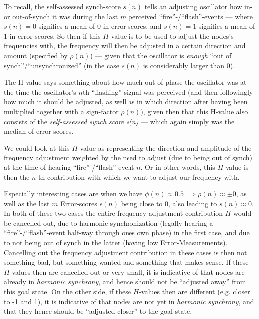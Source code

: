 		To recall, the self-assessed synch-score $s(n)$ tells an adjusting oscillator how in- or out-of-synch it was during the last $m$ perceived ``fire''-/``flash''-events — where $s(n)=0$ signifies a mean of 0 in error-scores, and $s(n)=1$ signifies a mean of 1 in error-scores. So then if this $H$-value is to be used to adjust the nodes's frequencies with, the frequency will then be adjusted in a certain direction and amount (specified by $\rho(n)$) — given that the oscillator is \textit{enough} ``out of synch''/``unsynchronized'' (in the case $s(n)$ is considerably larger than 0).

		The H-value says something about how much out of phase the oscillator was at the time the oscillator's $n$th ``flashing''-signal was perceived (and then followingly how much it should be adjusted, as well as in which direction after having been multiplied together with a sign-factor $\rho(n))$, given then that this H-value also consists of the \textit{self-assessed synch score s(n)} — which again simply was the median of error-scores.

		We could look at this $H$-value as representing the direction and amplitude of the frequency adjustment weighted by the need to adjust (due to being out of synch) at the time of hearing ``fire''-/``flash''-event $n$. Or in other words, this $H$-value is then the $n$-th contribution with which we want to adjust our frequency with.

		Especially interesting cases are when we have $\phi(n)\approx0.5 \implies \rho(n)\approx\pm0$, as well as the last $m$ Error-scores $\epsilon(n)$ being close to 0, also leading to $s(n)\approx0$. In both of these two cases the entire frequency-adjustment contribution $H$ would be cancelled out, due to harmonic synchronization (legally hearing a ``fire''-/``flash''-event half-way through ones own phase) in the first case, and due to not being out of synch in the latter (having low Error-Measurements). Cancelling out the frequency adjustment contribution in these cases is then not something bad, but something wanted and something that makes sense. If these $H$-values then are cancelled out or very small, it is indicative of that nodes are already in \textit{harmonic synchrony}, and hence should not be ``adjusted away'' from this goal state. On the other side, if these $H$-values then are different (e.g. closer to -1 and 1), it is indicative of that nodes are not yet in \textit{harmonic synchrony}, and that they hence should be ``adjusted closer'' to the goal state.
		

